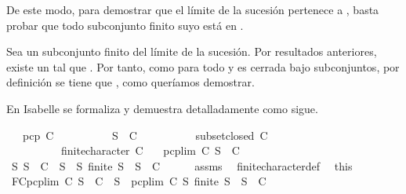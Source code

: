 \begin{isabellebody}
\begin{isamarkuptext}
\begin{demostracion}
    De este modo, para demostrar que el límite de la sucesión  pertenece a , basta probar
    que todo subconjunto finito suyo está en .

    Sea  un subconjunto finito del límite de la sucesión. Por resultados anteriores, existe un 
     tal que . Por tanto, como  para todo  y  es cerrada bajo
    subconjuntos, por definición se tiene que , como queríamos demostrar.
  \end{demostracion}

  En Isabelle se formaliza y demuestra detalladamente como sigue.%
\end{isamarkuptext}\isamarkuptrue%
\isamarkupfalse%
\isanewline
\ \ \ {\isachardoublequoteopen}pcp\ C{\isachardoublequoteclose}\isanewline
\ \ \ \ \ \ \ \ \ \ {\isachardoublequoteopen}S\ {\isasymin}\ C{\isachardoublequoteclose}\isanewline
\ \ \ \ \ \ \ \ \ \ {\isachardoublequoteopen}subset{\isacharunderscore}closed\ C{\isachardoublequoteclose}\isanewline
\ \ \ \ \ \ \ \ \ \ {\isachardoublequoteopen}finite{\isacharunderscore}character\ C{\isachardoublequoteclose}\isanewline
\ \ \ {\isachardoublequoteopen}pcp{\isacharunderscore}lim\ C\ S\ {\isasymin}\ C{\isachardoublequoteclose}\ \isanewline
%
\isadelimproof
%
\endisadelimproof
%
\isatagproof
{}\isamarkupfalse%
\ {\isacharminus}\isanewline
\ \ \isamarkupfalse%
\ {\isachardoublequoteopen}{\isasymforall}S{\isachardot}\ S\ {\isasymin}\ C\ {\isasymlongleftrightarrow}\ {\isacharparenleft}{\isasymforall}S{\isacharprime}\ {\isasymsubseteq}\ S{\isachardot}\ finite\ S{\isacharprime}\ {\isasymlongrightarrow}\ S{\isacharprime}\ {\isasymin}\ C{\isacharparenright}{\isachardoublequoteclose}\isanewline
\ \ \ \ \isamarkupfalse%
\ assms{\isacharparenleft}{}{\isacharparenright}\ \isamarkupfalse%
\ finite{\isacharunderscore}character{\isacharunderscore}def\ \isamarkupfalse%
\ this\isanewline
\ \ \isamarkupfalse%
\ \isamarkupfalse%
\ FC{}{\isacharcolon}{\isachardoublequoteopen}pcp{\isacharunderscore}lim\ C\ S\ {\isasymin}\ C\ {\isasymlongleftrightarrow}\ {\isacharparenleft}{\isasymforall}S{\isacharprime}\ {\isasymsubseteq}\ {\isacharparenleft}pcp{\isacharunderscore}lim\ C\ S{\isacharparenright}{\isachardot}\ finite\ S{\isacharprime}\ {\isasymlongrightarrow}\ S{\isacharprime}\ {\isasymin}\ C{\isacharparenright}{\isachardoublequoteclose}\isanewline

\end{isabellebody}
